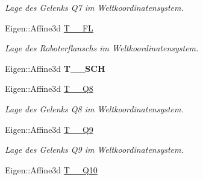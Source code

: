 \begin{DoxyCompactItemize}
\begin{DoxyCompactList}\small\item\em Lage des Gelenks Q7 im Weltkoordinatensystem. \end{DoxyCompactList}\item 
\hypertarget{classNumericKinematic_a1d4687858b97b4df67401ddb3bd2c5b4}{Eigen\-::\-Affine3d \hyperlink{classNumericKinematic_a1d4687858b97b4df67401ddb3bd2c5b4}{T\-\_\-\_\-\-F\-L}}\label{classNumericKinematic_a1d4687858b97b4df67401ddb3bd2c5b4}

\begin{DoxyCompactList}\small\item\em Lage des Roboterflanschs im Weltkoordinatensystem. \end{DoxyCompactList}\item 
\hypertarget{classNumericKinematic_a8e6f0493f1fc31b3c4e33b04ace1c6cc}{Eigen\-::\-Affine3d {\bfseries T\-\_\-\_\-\-S\-C\-H}}\label{classNumericKinematic_a8e6f0493f1fc31b3c4e33b04ace1c6cc}

\item 
\hypertarget{classNumericKinematic_a11368a132121a5dc639003ceeca8d0ec}{Eigen\-::\-Affine3d \hyperlink{classNumericKinematic_a11368a132121a5dc639003ceeca8d0ec}{T\-\_\-\_\-\-Q8}}\label{classNumericKinematic_a11368a132121a5dc639003ceeca8d0ec}

\begin{DoxyCompactList}\small\item\em Lage des Gelenks Q8 im Weltkoordinatensystem. \end{DoxyCompactList}\item 
\hypertarget{classNumericKinematic_a581d613f2ff4e2f8abf05690eb7eb08a}{Eigen\-::\-Affine3d \hyperlink{classNumericKinematic_a581d613f2ff4e2f8abf05690eb7eb08a}{T\-\_\-\_\-\-Q9}}\label{classNumericKinematic_a581d613f2ff4e2f8abf05690eb7eb08a}

\begin{DoxyCompactList}\small\item\em Lage des Gelenks Q9 im Weltkoordinatensystem. \end{DoxyCompactList}\item 
\hypertarget{classNumericKinematic_a628bae48695ed11d4e6072889e75062b}{Eigen\-::\-Affine3d \hyperlink{classNumericKinematic_a628bae48695ed11d4e6072889e75062b}{T\-\_\-\_\-\-Q10}}\label{classNumericKinematic_a628bae48695ed11d4e6072889e75062b}


\end{DoxyCompactItemize}
